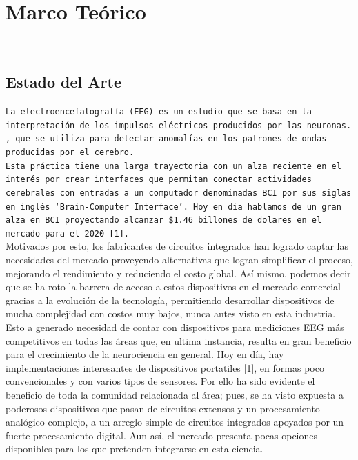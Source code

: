 \chapter{Marco Teórico}\\

\section{Estado del Arte}
\label{sec:orgc709def}
\texttt{La electroencefalografía (EEG) es un estudio que se basa en la interpretación de los impulsos eléctricos producidos por las neuronas.}\\

\texttt{, que se utiliza para detectar anomalías en los patrones de ondas producidas por el cerebro.}\\

\texttt{Esta práctica tiene una larga trayectoria con un alza reciente en el interés por crear interfaces que permitan conectar actividades cerebrales con entradas a un computador denominadas BCI por sus siglas en inglés ‘Brain-Computer Interface’. Hoy en dia hablamos de un gran alza en BCI proyectando alcanzar \$1.46 billones de dolares en el mercado para el 2020 [1].}\\

Motivados por esto, los fabricantes de circuitos integrados han logrado captar las necesidades del mercado proveyendo alternativas que logran simplificar el proceso, mejorando el rendimiento y reduciendo el costo global. Así mismo, podemos decir que se ha roto la barrera de acceso a estos dispositivos en el mercado comercial gracias a la evolución de la tecnología, permitiendo desarrollar dispositivos de mucha complejidad con costos muy bajos, nunca antes visto en esta industria.\\

Esto a generado necesidad de contar con dispositivos para mediciones EEG más competitivos en todas las áreas que, en ultima instancia, resulta en gran beneficio para el crecimiento de la neurociencia en general. Hoy en día, hay implementaciones interesantes de dispositivos portatiles [1], en formas poco convencionales y con varios tipos de sensores. Por ello ha sido evidente el beneficio de toda la comunidad relacionada al área; pues, se ha visto expuesta a poderosos dispositivos que pasan de circuitos extensos y un procesamiento analógico complejo, a un arreglo simple de circuitos integrados apoyados por un fuerte procesamiento digital. Aun así, el mercado presenta pocas opciones disponibles para los que pretenden integrarse en esta ciencia.\\

